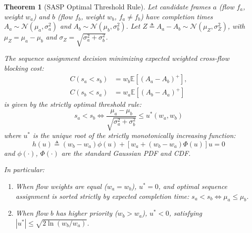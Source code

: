 \documentclass[10pt,journal,compsoc]{IEEEtran}
\newtheorem{theorem}{Theorem}
\begin{document}
\begin{theorem}[SASP Optimal Threshold Rule]
\label{thm:sasp}
Let candidate frames $a$ (flow $f_a$, weight $w_a$) and $b$ (flow $f_b$, weight $w_b$, $f_a \ne f_b$) have completion times $A_a \sim \mathcal{N}(\mu_a, \sigma_a^2)$ and $A_b \sim \mathcal{N}(\mu_b, \sigma_b^2)$. Let $Z \triangleq A_a - A_b \sim \mathcal{N}(\mu_Z, \sigma_Z^2)$, with $\mu_Z = \mu_a - \mu_b$ and $\sigma_Z = \sqrt{\sigma_a^2 + \sigma_b^2}$.

The sequence assignment decision minimizing expected weighted cross-flow blocking cost:
\begin{align}
    C(s_a < s_b) &= w_b \mathbb{E}[(A_a - A_b)^+], \nonumber \\
    C(s_b < s_a) &= w_a \mathbb{E}[(A_b - A_a)^+]
\end{align}
is given by the strictly optimal threshold rule:
\begin{equation}
    s_a < s_b \iff \frac{\mu_a - \mu_b}{\sqrt{\sigma_a^2 + \sigma_b^2}} \le u^*(w_a, w_b)
\end{equation}
where $u^*$ is the unique root of the strictly monotonically increasing function:
\begin{equation}
    h(u) \triangleq (w_b - w_a) \phi(u) + \left[ w_a + (w_b - w_a)\Phi(u) \right] u = 0
\end{equation}
and $\phi(\cdot)$, $\Phi(\cdot)$ are the standard Gaussian PDF and CDF.

In particular:
\begin{enumerate}
    \item When flow weights are equal ($w_a = w_b$), $u^* = 0$, and optimal sequence assignment is sorted strictly by expected completion time: $s_a < s_b \iff \mu_a \le \mu_b$.
    \item When flow $b$ has higher priority ($w_b > w_a$), $u^* < 0$, satisfying $|u^*| \le \sqrt{2 \ln(w_b / w_a)}$.
\end{enumerate}
\end{theorem}
\end{document}
